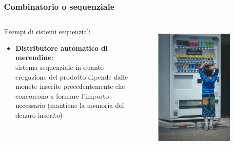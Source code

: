 \begin{frame}
	\frametitle{Combinatorio o sequenziale}
		
	\begin{columns}			
		
		\begin{block}{Esempi di sistemi sequenziali}
		\begin{itemize}
			\item \textbf{Distributore automatico di merendine}:\\sistema sequenziale in quanto erogazione del prodotto dipende dalle monete inserite precedentemente che concorrono a formare l'importo necessario (mantiene la memoria del denaro inserito)
		\end{itemize}
		\end{block}
					
		\begin{figure}[!htbp] 
			\centering
			\includegraphics[width=0.85\linewidth]{images/1_i_sistemi/vending_machine.jpg}
			\label{fig:systems_vendingmachine}
		\end{figure}
		
	\end{columns}
	
\end{frame}


